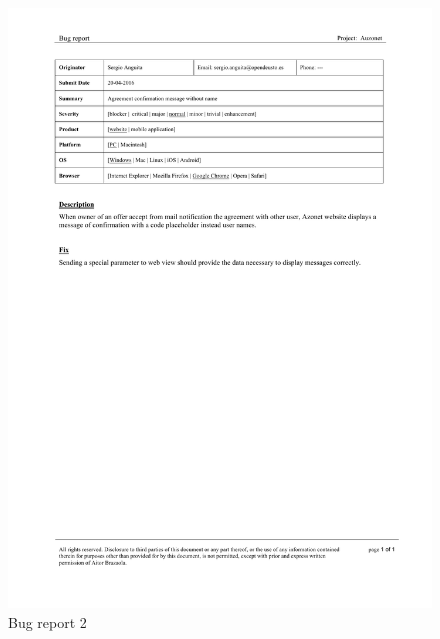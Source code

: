 \documentclass{DeustoFDP}
\begin{document}
\begin{figure}[h!]
	\centering
	\includegraphics[width=1\linewidth]{fig/Bugs/b2}
	\caption[Bug report]{Bug report 2}
	\label{fig:b2}
\end{figure}
\end{document}
